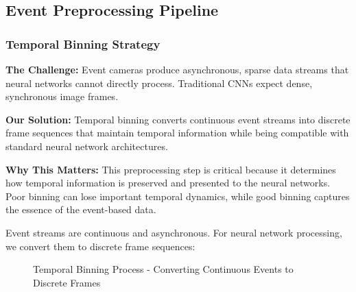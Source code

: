 \documentclass[12pt,a4paper]{article}
\begin{document}
\subsection{Event Preprocessing Pipeline}

\subsubsection{Temporal Binning Strategy}

\textbf{The Challenge:} Event cameras produce asynchronous, sparse data streams that neural networks cannot directly process. Traditional CNNs expect dense, synchronous image frames.

\textbf{Our Solution:} Temporal binning converts continuous event streams into discrete frame sequences that maintain temporal information while being compatible with standard neural network architectures.

\textbf{Why This Matters:} This preprocessing step is critical because it determines how temporal information is preserved and presented to the neural networks. Poor binning can lose important temporal dynamics, while good binning captures the essence of the event-based data.

Event streams are continuous and asynchronous. For neural network processing, we convert them to discrete frame sequences:

\begin{figure}[H]
\centering
{}
\caption{Temporal Binning Process - Converting Continuous Events to Discrete Frames}
\end{figure}
\end{document}
